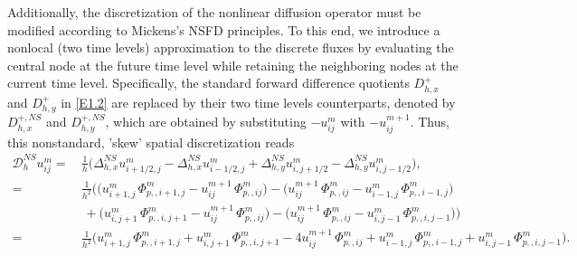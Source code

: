 \documentclass[final,12pt,3p]{elsarticle}
\theoremstyle{plain}
\theoremstyle{definition}
\theoremstyle{remark}
\begin{document}
Additionally, the discretization of the nonlinear diffusion operator must be modified according to Mickens's NSFD principles. 
To this end, we introduce a nonlocal (two time levels) approximation to the discrete fluxes by evaluating the central node at the future time level while retaining the neighboring nodes at the current time level. 
Specifically, the standard forward difference quotients $D_{h,x}^+$ and $D_{h,y}^+$ in \eqref{E1.2} are replaced by their two time levels counterparts, denoted by $D_{h,x}^{+,NS}$ and $D_{h,y}^{+,NS}$, which are obtained by substituting $-u_{ij}^m$ with $-u_{ij}^{m+1}$. 
Thus, this nonstandard, 'skew' spatial discretization reads 
\begin{equation}\label{E2.2}
\begin{split}
\mathcal{D}_h^{NS} u_{ij}^m =\,& \frac{1}{h} \Big(
\Delta_{h,x}^{NS} u_{i+1/2,j}^m - \Delta_{h,x}^{NS} u_{i-1/2,j}^m 
+ \Delta_{h,y}^{NS} u_{i,j+1/2}^m - \Delta_{h,y}^{NS} u_{i,j-1/2}^m \Big),\\
=\,& \frac{1}{h^2} \Big(
\bigl(u_{i+1,j}^m\,\Phi_{p,,i+1,j}^m - u_{ij}^{m+1}\,\Phi_{p,,ij}^m \bigr) 
- \bigl(u_{ij}^{m+1}\,\Phi_{p,,ij}^m - u_{i-1,j}^m\,\Phi_{p,,i-1,j}^m \bigr)\\
&\,+ \bigl(u_{i,j+1}^m\,\Phi_{p,,i,j+1}^m - u_{ij}^{m+1}\,\Phi_{p,,ij}^m \bigr)
- \bigl(u_{ij}^{m+1}\,\Phi_{p,,ij}^m - u_{i,j-1}^m\,\Phi_{p,,i,j-1}^m \bigr) 
\Big)\\
=\,& \frac{1}{h^2} \Big(
u_{i+1,j}^m\,\Phi_{p,,i+1,j}^m + u_{i,j+1}^m\,\Phi_{p,,i,j+1}^m - 4 u_{ij}^{m+1}\,\Phi_{p,,ij}^m 
 + u_{i-1,j}^m\,\Phi_{p,,i-1,j}^m 
+ u_{i,j-1}^m\,\Phi_{p,,i,j-1}^m \Big).
\end{split}
\end{equation}
\end{document}
